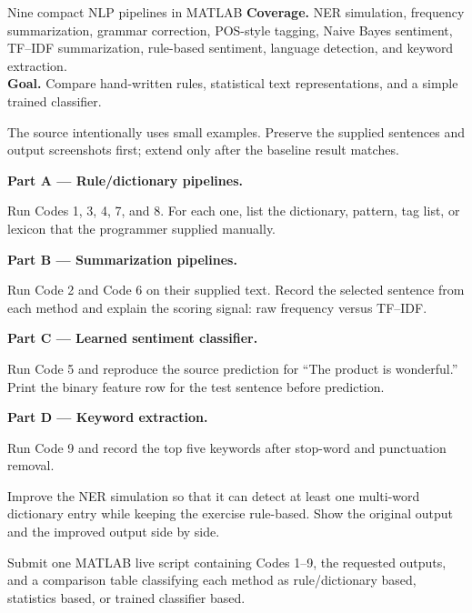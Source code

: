 
\begin{labproject}{Nine compact NLP pipelines in MATLAB}
\textbf{Coverage.} NER simulation, frequency summarization, grammar correction, POS-style tagging, Naive Bayes sentiment, TF--IDF summarization, rule-based sentiment, language detection, and keyword extraction.\\
\textbf{Goal.} Compare hand-written rules, statistical text representations, and a simple trained classifier.

\begin{labmode}
The source intentionally uses small examples. Preserve the supplied sentences and output screenshots first; extend only after the baseline result matches.
\end{labmode}

\medskip\noindent\textbf{Part A --- Rule/dictionary pipelines.}\par
Run Codes 1, 3, 4, 7, and 8. For each one, list the dictionary, pattern, tag list, or lexicon that the programmer supplied manually.

\medskip\noindent\textbf{Part B --- Summarization pipelines.}\par
Run Code 2 and Code 6 on their supplied text. Record the selected sentence from each method and explain the scoring signal: raw frequency versus TF--IDF.

\medskip\noindent\textbf{Part C --- Learned sentiment classifier.}\par
Run Code 5 and reproduce the source prediction for ``The product is wonderful.'' Print the binary feature row for the test sentence before prediction.

\medskip\noindent\textbf{Part D --- Keyword extraction.}\par
Run Code 9 and record the top five keywords after stop-word and punctuation removal.

\begin{tryit}
Improve the NER simulation so that it can detect at least one multi-word dictionary entry while keeping the exercise rule-based. Show the original output and the improved output side by side.
\end{tryit}
\end{labproject}

\begin{labdeliverable}
Submit one MATLAB live script containing Codes 1--9, the requested outputs, and a comparison table classifying each method as rule/dictionary based, statistics based, or trained classifier based.
\end{labdeliverable}
